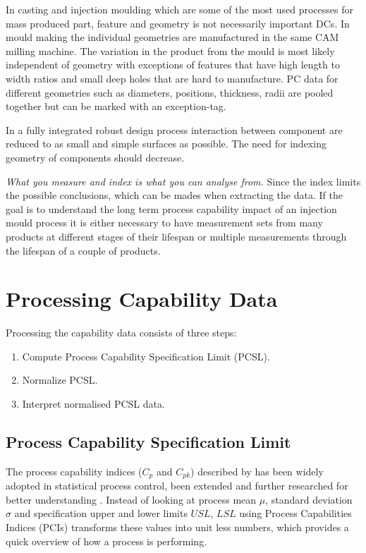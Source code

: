 \documentclass[aip,amsmath, reprint, author-year]{revtex4-1}
\begin{document}
In casting and injection moulding which are some of the most used processes for mass produced part, feature and geometry is not necessarily important DCs. In mould making the individual geometries are manufactured in the same CAM milling machine. 
The variation in the product from the mould is most likely independent of geometry with exceptions of features that have high length to width ratios and small deep holes that are hard to manufacture. PC data for different geometries such as diameters, positions, thickness, radii are pooled together but can be marked with an exception-tag.

In a fully integrated robust design process interaction between component are reduced to as small and simple surfaces as possible. The need for indexing geometry of components should decrease.

\emph{What you measure and index is what you can analyse from.}
Since the index limits the possible conclusions, which can be mades when extracting the data. If the goal is to understand the long term process capability impact of an injection mould process it is either necessary to have measurement sets from many products at different stages of their lifespan or multiple measurements through the lifespan of a couple of products.    

\section{Processing Capability Data}

Processing the capability data consists of three steps: 

\begin{enumerate}
	\item Compute Process Capability Specification Limit (PCSL).
	\item Normalize PCSL.
	\item Interpret normalised PCSL data.
\end{enumerate}

\subsection{Process Capability Specification Limit}
The process capability indices ($C_p$ and $C_{pk}$) described by \cite{kane1986process} has been widely adopted in statistical process control, been extended and further researched for better understanding \citep{wu2009overview}. 
Instead of looking at process mean $\mu$, standard deviation $\sigma$ and specification upper and lower limits $USL$, $LSL$ using Process Capabilities Indices (PCIs) transforms these values into unit less numbers, which provides a quick overview of how a process is performing.
\end{document}
